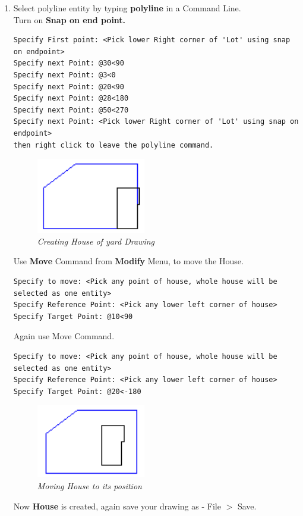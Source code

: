 \begin{enumerate}
\item{Select polyline entity by typing \textbf{polyline} in a Command Line.\\
Turn on \textbf{Snap on end point.}
\begin{verbatim}
Specify First point: <Pick lower Right corner of 'Lot' using snap on endpoint>
Specify next Point: @30<90
Specify next Point: @3<0
Specify next Point: @20<90
Specify next Point: @28<180
Specify next Point: @50<270
Specify next Point: <Pick lower Right corner of 'Lot' using snap on endpoint>
then right click to leave the polyline command.
\end{verbatim}
\begin{figure}[h!]
       \centering\includegraphics[width=180px]{./images-yard/house-rt.png}
       \caption{\small \sl Creating House of yard Drawing}
       \end{figure}
Use \textbf{Move} Command from \textbf{Modify} Menu, to move the House.
\begin{verbatim}
Specify to move: <Pick any point of house, whole house will be selected as one entity>
Specify Reference Point: <Pick any lower left corner of house>
Specify Target Point: @10<90
\end{verbatim} 
Again use Move Command.
\begin{verbatim}
Specify to move: <Pick any point of house, whole house will be selected as one entity>
Specify Reference Point: <Pick any lower left corner of house>
Specify Target Point: @20<-180
\end{verbatim} 
\begin{figure}[h!]
       \centering\includegraphics[width=180px]{./images-yard/house-mv.png}
       \caption{\small \sl Moving House to its position}
       \end{figure}
Now \textbf{House} is created, again save your drawing as -  File $>$ Save.}

\end{enumerate}
